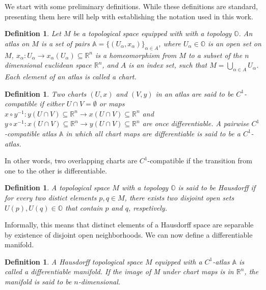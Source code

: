 \documentclass[a4paper,11pt]{elsarticle}
\newtheorem{definition}[theorem]{Definition}
\begin{document}
We start with some preliminary definitions. While these definitions
are standard, presenting them here will help with establishing the
notation used in this work.

\begin{definition}
  Let $M$ be a topological space equipped with with a topology
  $\mathbb{O}$. An atlas on $M$ is a set of pairs
  $\mathbb{A} = \{(U_{\alpha}, x_{\alpha})\}_{\alpha \in A}$, where
  $U_{\alpha} \in \mathbb{O}$ is an open set on $M$, $x_{\alpha}:
  U_{\alpha} \to x_{\alpha}(U_{\alpha}) \subseteq \mathbb{R}^{n}$ is a
  homeomorphism from $M$ to a subset of the $n$ dimensional euclidean
  space $\mathbb{R}^{n}$, and $A$ is an index set, such that $M =
  \bigcup_{\alpha \in A} U_{\alpha}$. Each element of an atlas is
  called a chart.
\end{definition}

\begin{definition}
  Two charts $(U, x)$ and $(V, y)$ in an atlas are said to be
  $C^{1}$-compatible if either $U \cap V = \emptyset$ or maps $x \circ
  y^{-1}: y(U \cap V) \subseteq \mathbb{R}^{n} \to x(U \cap V)
  \subseteq \mathbb{R}^{n}$ and $y \circ x^{-1}: x(U \cap V) \subseteq
  \mathbb{R}^{n} \to y(U \cap V) \subseteq \mathbb{R}^{n}$ are once
  differentiable. A pairwise $C^{1}$-compatible atlas $\mathbb{A}$ in
  which all chart maps are differentiable is said to be a
  $C^{1}$-atlas.
\end{definition}

In other words, two overlapping charts are $C^{1}$-compatible if
the transition from one to the other is differentiable.
  
\begin{definition}
  A topological space $M$ with a topology $\mathbb{O}$ is said to be
  Hausdorff if for every two distict elements $p, q \in M$, there
  exists two disjoint open sets $U(p), U(q) \in \mathbb{O}$ that
  contain $p$ and $q$, respetively.
\end{definition}

Informally, this means that distinct elements of a Hausdorff space are
separable by existence of disjoint open neighborhoods. We can now
define a differentiable manifold.

\begin{definition}
  A Hausdorff topological space $M$ equipped with a $C^{1}$-atlas
  $\mathbb{A}$ is called a differentiable manifold. If the image of M
  under chart maps is in $\mathbb{R}^{n}$, the manifold is said to be
  $n$-dimensional.
\end{definition}
\end{document}
